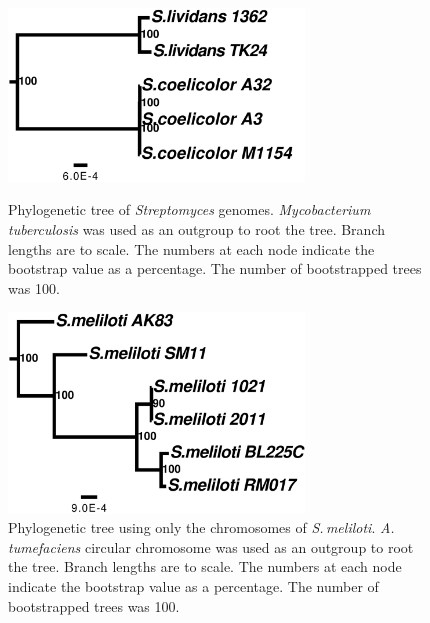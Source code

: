 \documentclass[11pt]{article}
\newcommand{\smel}{\textit{S.\,meliloti}\xspace}
\newcommand{\agro}{\textit{A.\,tumefaciens}\xspace}
\newcommand{\strep}{\textit{Streptomyces}\xspace}
\newcommand{\tub}{\textit{Mycobacterium tuberculosis}\xspace}
\begin{document}
		\begin{figure}[H]
		\begin{center}
			\includegraphics[width=0.7\textwidth]{./figs/Strep_chrom_figtree_raw_11Sep20.pdf}
			\caption{\label{fig:streptree} Phylogenetic tree of \strep genomes. \tub was used as an outgroup to root the tree. Branch lengths are to scale. The numbers at each node indicate the bootstrap value as a percentage. The number of bootstrapped trees was 100.}
		\end{center}
			\vspace*{\floatsep}%
		\begin{center}
			\includegraphics[width=0.7\textwidth]{./figs/SinoC_chrom_figtree_raw_11Sep20.pdf}
			\caption{\label{fig:sinoCtree} Phylogenetic tree using only the chromosomes of \smel. \agro circular chromosome was used as an outgroup to root the tree. Branch lengths are to scale. The numbers at each node indicate the bootstrap value as a percentage. The number of bootstrapped trees was 100.}
		\end{center}
	\end{figure}
		
\end{document}
